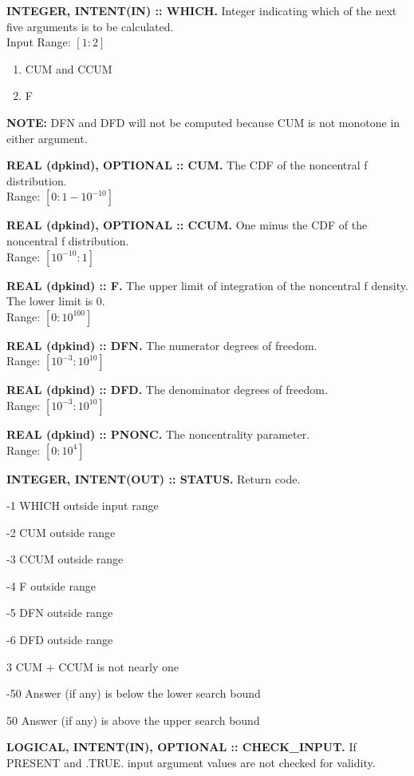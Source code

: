 \documentclass[12pt,dvips]{article}
\newcommand{\range}[2]{\hfill Range: \ensuremath{\left[ #1:#2
\right]}\\}
\newcommand{\inrange}[2]{\hfill Input Range: \ensuremath{\left[ #1:#2
\right]}\\}
\newcommand{\sdf}{10^{-3}}
\newcommand{\bdf}{10^{10}}
\newcommand{\sprob}{10^{-10}}
\newcommand{\bprob}{1-\sprob}
\newcommand{\immense}{10^{100}}
\newcommand{\spnonc}{0}
\newcommand{\bpnonc}{10^4}
\newcommand{\myitem}[1]{\item{\bf \color{Violet} #1 \normalcolor}}
\begin{document}
\begin{description}

\myitem{INTEGER, INTENT(IN)  :: WHICH.} Integer indicating  which of the
next five arguments is to be calculated.\\
\inrange{1}{2}
\begin{enumerate}
\item CUM and CCUM
\item F
\end{enumerate}

{\bf  NOTE:} DFN  and DFD  will  not be  computed because  CUM is  not
monotone in either argument.

\myitem{REAL  (dpkind), OPTIONAL ::  CUM.} The  CDF of  the  noncentral f
distribution.\\ \range{0}{\bprob}

\myitem{REAL (dpkind), OPTIONAL :: CCUM.} One minus the CDF of the
noncentral f distribution.\\
\range{\sprob}{1}

\myitem{REAL (dpkind) :: F.}  The upper limit of integration of
the noncentral f density.  The lower limit is 0.\\
\range{0}{\immense}

\myitem{REAL (dpkind) :: DFN.}  The numerator degrees of
freedom.\\
\range{\sdf}{\bdf}

\myitem{REAL (dpkind) :: DFD.}  The denominator degrees of freedom.\\
\range{\sdf}{\bdf}

\myitem{REAL (dpkind) :: PNONC.}  The noncentrality parameter.\\
\range{\spnonc}{\bpnonc}

\myitem{INTEGER, INTENT(OUT) :: STATUS.} Return code.
\begin{description}
\item{-1}  WHICH outside input range
\item{-2}  CUM outside range
\item{-3}  CCUM outside range
\item{-4}  F outside range
\item{-5}  DFN outside range
\item{-6}  DFD outside range
\item{3} CUM + CCUM is not nearly one
\item{-50} Answer (if any) is below the lower search bound
\item{50} Answer (if any) is above the upper search bound
\end{description}

\myitem{LOGICAL, INTENT(IN), OPTIONAL :: CHECK\_INPUT.}  If PRESENT
and .TRUE. input argument values are not checked for validity.

\end{description}
\end{document}
